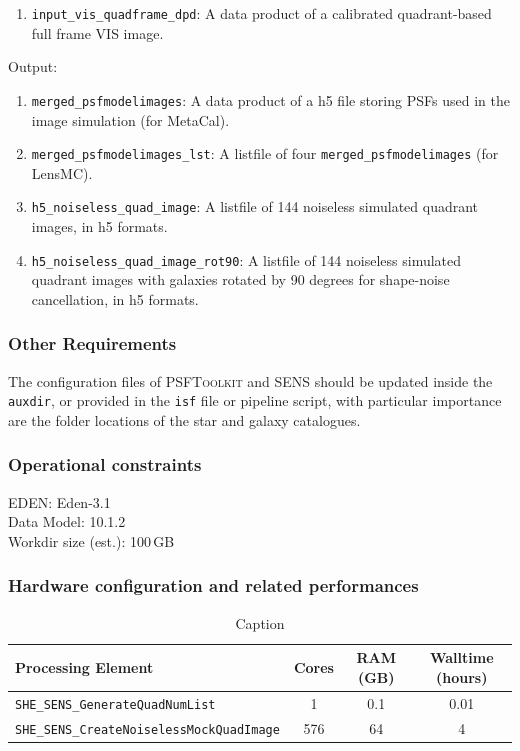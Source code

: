 \documentclass[11pt]{EuclidVIS}
\numberwithin{table}{section}
\numberwithin{figure}{section}
\begin{document}
\begin{enumerate}
    \item \texttt{input\_vis\_quadframe\_dpd}: A data product of a calibrated quadrant-based full frame VIS image.
\end{enumerate}

\noindent Output:

\begin{enumerate}
    \item \texttt{merged\_psfmodelimages}: A data product of a h5 file storing PSFs used in the image simulation (for MetaCal).
    \item \texttt{merged\_psfmodelimages\_lst}: A listfile of four \texttt{merged\_psfmodelimages} (for LensMC).
    \item \texttt{h5\_noiseless\_quad\_image}: A listfile of 144 noiseless simulated quadrant images, in h5 formats.
    \item \texttt{h5\_noiseless\_quad\_image\_rot90}: A listfile of 144 noiseless simulated quadrant images with galaxies rotated by 90 degrees for shape-noise cancellation, in h5 formats.
\end{enumerate}

\subsubsection{Other Requirements}

The configuration files of \textsc{PSFToolkit} and \textsc{SENS} should be updated inside the \texttt{auxdir}, or provided in the \texttt{isf} file or pipeline script, with particular importance are the folder locations of the star and galaxy catalogues.

\subsubsection{Operational constraints}

\noindent EDEN: Eden-3.1\\
\noindent Data Model: 10.1.2\\
\noindent Workdir size (est.): 100\,GB

\subsubsection{Hardware configuration and related performances}

\begin{table}[]
    \centering
    \begin{tabular}{|l|c|c|c|}
         \hline
         Processing Element                               & Cores & RAM (GB) & Walltime (hours) \\
         \hline
         \texttt{SHE\_SENS\_GenerateQuadNumList}          & 1     & 0.1      & 0.01 \\
         \texttt{SHE\_SENS\_CreateNoiselessMockQuadImage} & 576   & 64       & 4  \\
         \hline
    \end{tabular}
    \caption{Caption}
    \label{tab:my_label}
\end{table}
\end{document}
